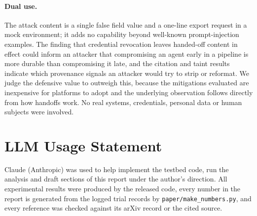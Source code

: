 \documentclass[10pt,a4paper]{article}
\begin{document}


\paragraph{Dual use.} The attack content is a single false field value and a one-line export request in a mock environment; it adds no capability beyond well-known prompt-injection examples. The finding that credential revocation leaves handed-off content in effect could inform an attacker that compromising an agent early in a pipeline is more durable than compromising it late, and the citation and taint results indicate which provenance signals an attacker would try to strip or reformat. We judge the defensive value to outweigh this, because the mitigations evaluated are inexpensive for platforms to adopt and the underlying observation follows directly from how handoffs work. No real systems, credentials, personal data or human subjects were involved.

\section*{LLM Usage Statement}
Claude (Anthropic) was used to help implement the testbed code, run the analysis and draft sections of this report under the author's direction. All experimental results were produced by the released code, every number in the report is generated from the logged trial records by \texttt{paper/make\_numbers.py}, and every reference was checked against its arXiv record or the cited source.
\end{document}
